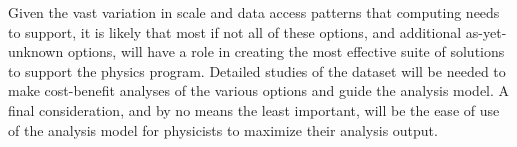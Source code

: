 \documentclass[../main-v1.tex]{subfiles}
\begin{document}
Given the vast variation in scale and data access patterns that  computing needs to support, it is likely that most if not all of these options, and additional as-yet-unknown options, will have a role in creating the most effective suite of solutions to support the physics program. Detailed studies of the  dataset will be needed to make cost-benefit analyses of the various options and guide the analysis model.  A final consideration, and by no means the least important, will be the ease of use of the analysis model for physicists to maximize their analysis output.
\end{document}
